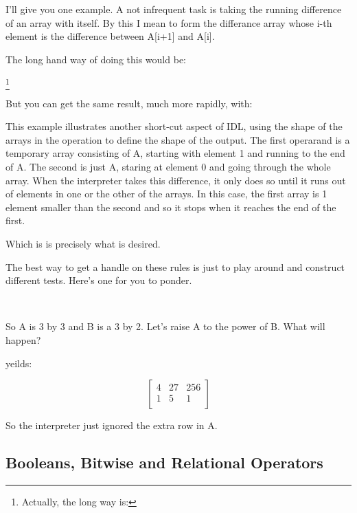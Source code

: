   I'll give you one example. A not infrequent task is taking the
  running difference of an array with itself. By this I mean to form
  the differance array whose i-th element is the difference between
  A[i+1] and A[i]. 

  The long hand way of doing this would be:


  \footnote{Actually, the 
  long way is: }

  But you can get the same result, much more rapidly, with:


  This example illustrates another short-cut aspect of IDL, using the
  shape of the arrays in the operation to define the shape of the
  output. The first operarand is a temporary array consisting of A,
  starting with element 1 and running to the end of A. The second is
  just A, staring at element 0 and going through the whole array.  When
  the interpreter takes this difference, it only does so until it runs
  out of elements in one or the other of the arrays. In this case, the
  first array is 1 element smaller than the second and so it stops when
  it reaches the end of the first. 

  Which is  is precisely what is desired.

  The best way to get a handle on these rules is just to play around
  and construct different tests. Here's one for you to ponder.

  \\

  So A is 3 by 3 and B is a 3 by 2. Let's raise A to the power of
  B. What will happen?
  

   yeilds:

     \[ \left[ \begin{array}{ccc}
       4  &    27  &   256\\
       1  &     5  &     1\\
     \end{array} \right] \]



    So the interpreter just ignored the extra row in A.

\subsection{Booleans, Bitwise and Relational Operators}
\label{sec:qs-Boolean-Bitwise-Relational-Ops}

